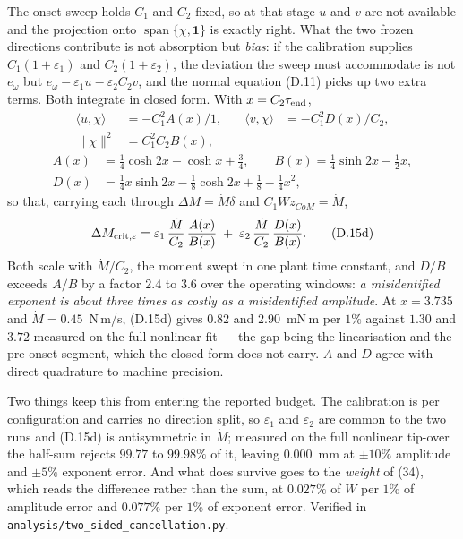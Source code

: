 \documentclass[11pt]{article}
\newcommand{\Wz}{W\!z_{CoM}}
\newcommand{\te}{\tau_{\rm end}}
\begin{document}
The onset sweep holds $C_1$ and $C_2$ fixed, so at that stage $u$ and
$v$ are not available and the projection onto
$\operatorname{span}\{\chi,\mathbf{1}\}$ is exactly right. What the two
frozen directions contribute is not absorption but \emph{bias}: if the
calibration supplies $C_1(1+\varepsilon_1)$ and $C_2(1+\varepsilon_2)$,
the deviation the sweep must accommodate is not $e_\omega$ but
$e_\omega - \varepsilon_1u - \varepsilon_2C_2v$, and the normal equation
(D.11) picks up two extra terms. Both integrate in closed form. With
$x = C_2\te$,
\begin{equation}
\begin{aligned}
  \langle u,\chi\rangle &= -C_1^{2}A(x)\big/1, &\quad
  \langle v,\chi\rangle &= -C_1^{2}D(x)/C_2, \\
  \|\chi\|^{2} &= C_1^{2}C_2B(x),
\end{aligned}
  \tag{D.15b}
\end{equation}
\begin{equation}
\begin{aligned}
  A(x) &= \tfrac14\cosh 2x - \cosh x + \tfrac34, \qquad
  B(x) = \tfrac14\sinh 2x - \tfrac12x, \\
  D(x) &= \tfrac14x\sinh 2x - \tfrac18\cosh 2x + \tfrac18
          - \tfrac14x^{2},
\end{aligned}
  \tag{D.15c}
\end{equation}
so that, carrying each through $\Delta M = \dot M\delta$ and
$C_1\Wz = \dot M$,
\begin{equation}
  \Delta M_{{\rm crit},\varepsilon}
   = \varepsilon_1\,\frac{\dot M}{C_2}\,\frac{A(x)}{B(x)}
   \;+\; \varepsilon_2\,\frac{\dot M}{C_2}\,\frac{D(x)}{B(x)} .
  \tag{D.15d}
\end{equation}
Both scale with $\dot M/C_2$, the moment swept in one plant time
constant, and $D/B$ exceeds $A/B$ by a factor $2.4$ to $3.6$ over the
operating windows: \emph{a misidentified exponent is about three times
as costly as a misidentified amplitude}. At $x = 3.735$ and
$\dot M = 0.45$~N\,m/s, (D.15d) gives $0.82$ and $2.90$~mN\,m per $1\%$
against $1.30$ and $3.72$ measured on the full nonlinear fit --- the
gap being the linearisation and the pre-onset segment, which the closed
form does not carry. $A$ and $D$ agree with direct quadrature to
machine precision.

Two things keep this from entering the reported budget. The
calibration is per configuration and carries no direction split, so
$\varepsilon_1$ and $\varepsilon_2$ are common to the two runs and
(D.15d) is antisymmetric in $\dot M$; measured on the full nonlinear
tip-over the half-sum rejects $99.77$ to $99.98\%$ of it, leaving
$0.000$~mm at $\pm10\%$ amplitude and $\pm5\%$ exponent error. And what
does survive goes to the \emph{weight} of (34), which reads the
difference rather than the sum, at $0.027\%$ of $W$ per $1\%$ of
amplitude error and $0.077\%$ per $1\%$ of exponent error. Verified in
\texttt{analysis/two\_sided\_cancellation.py}.
\end{document}
